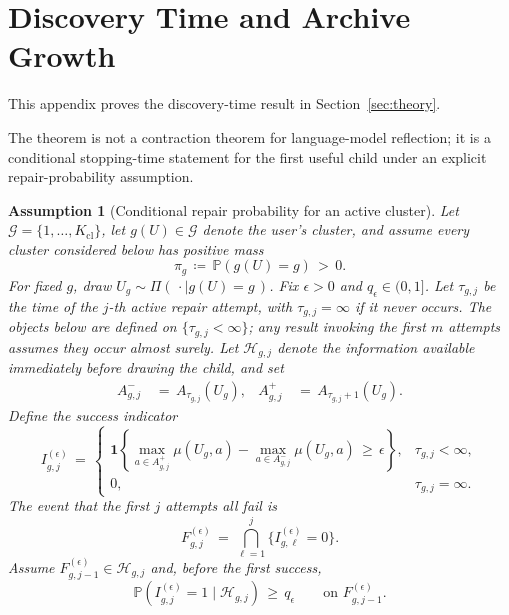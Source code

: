 \documentclass{article} %
\newtheorem{assumption}{Assumption}
\begin{document}
\section{Discovery Time and Archive Growth}

\label{app:proofs3}

This appendix proves the discovery-time result in Section~\ref{sec:theory}.

The theorem is not a contraction theorem for language-model reflection; it is a conditional stopping-time statement for the first useful child under an explicit repair-probability assumption.

\begin{assumption}[Conditional repair probability for an active cluster]
\label{assump:app-repair}
Let \(\mathcal G=\{1,\ldots,K_{\mathrm{cl}}\}\), let \(g(U)\in\mathcal G\)
denote the user's cluster, and assume every cluster considered below has
positive mass
\begin{equation}
\pi_g
\,\coloneqq\,
\mathbb P(g(U)=g)
\,>\,
0.
\end{equation}
For fixed \(g\), draw
\(U_g\sim\Pi(\,\cdot\mid g(U)=g\,)\).  Fix \(\epsilon>0\) and
\(q_\epsilon\in(0,1]\).  Let \(\tau_{g,j}\) be the time of the \(j\)-th active
repair attempt, with \(\tau_{g,j}=\infty\) if it never occurs.  The objects
below are defined on \(\{\tau_{g,j}<\infty\}\); any result invoking the first
\(m\) attempts assumes they occur almost surely.  Let \(\mathcal H_{g,j}\)
denote the information available immediately before drawing the child, and set
\begin{equation}
\begin{aligned}
A_{g,j}^{-}
&\,=\,A_{\tau_{g,j}}(U_g), &
A_{g,j}^{+}
&\,=\,A_{\tau_{g,j}+1}(U_g).
\end{aligned}
\end{equation}
Define the success indicator
\begin{equation}
I_{g,j}^{(\epsilon)}
\,=\,
\begin{cases}
\mathbf{1}\!\left\{
\max_{a\in A_{g,j}^{+}}\mu(U_g,a)
-
\max_{a\in A_{g,j}^{-}}\mu(U_g,a)
\,\ge\,
\epsilon
\right\},
& \tau_{g,j}<\infty,\\[1mm]
0,
& \tau_{g,j}=\infty.
\end{cases}
\end{equation}
The event that the first \(j\) attempts all fail is
\begin{equation}
F_{g,j}^{(\epsilon)}
\,=\,
\bigcap_{\ell=1}^{j}
\{I_{g,\ell}^{(\epsilon)}=0\}.
\end{equation}
Assume \(F_{g,j-1}^{(\epsilon)}\in\mathcal H_{g,j}\) and, before the first
success,
\begin{equation}
\label{eq:app-third-repair-condition}
\mathbb{P}\!\left(
I_{g,j}^{(\epsilon)}=1
\mid
\mathcal{H}_{g,j}
\right)
\,\geq\,
q_{\epsilon}
\qquad
\text{on }F_{g,j-1}^{(\epsilon)}.
\end{equation}
\end{assumption}
\end{document}
